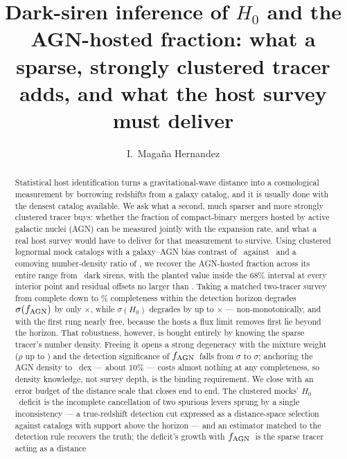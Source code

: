 \documentclass[twocolumn]{aastex631}
\newcommand{\Hz}{\ensuremath{H_0}}
\newcommand{\fagn}{\ensuremath{f_{\rm AGN}}}
\begin{document}
\title{Dark-siren inference of $H_0$ and the AGN-hosted fraction: what a sparse,
strongly clustered tracer adds, and what the host survey must deliver}

\author{I.~Maga\~na Hernandez}

\begin{abstract}
Statistical host identification turns a gravitational-wave distance into a
cosmological measurement by borrowing redshifts from a galaxy catalog, and it is
usually done with the densest catalog available. We ask what a second, much
sparser and more strongly clustered tracer buys: whether the fraction of
compact-binary mergers hosted by active galactic nuclei (AGN) can be measured
jointly with the expansion rate, and what a real host survey would have to
deliver for that measurement to survive. Using clustered lognormal mock
catalogs with a galaxy--AGN bias contrast of \GlassBiasGal\ against
\GlassBiasAgn\ and a comoving number-density ratio of \GlassDensityRatio, we
recover the AGN-hosted fraction across its entire range from \GlassNobs\ dark
sirens, with the planted value inside the 68\% interval at every interior point
and residual offsets no larger than \BaseFOffMaxAbs. Taking a matched
two-tracer survey from complete down to \IncMeighteenCPct\% completeness within
the detection horizon degrades $\sigma(\fagn)$ by only \IncFacFMax$\times$,
while $\sigma(\Hz)$ degrades by up to \IncFacHzeroMax$\times$ ---
non-monotonically, and with the first rung nearly free, because the hosts a
flux limit removes first lie beyond the horizon. That robustness, however, is bought
entirely by knowing the sparse tracer's number density. Freeing it opens a
strong degeneracy with the mixture weight ($\rho$ up to \FreeRhoMax) and the
detection significance of \fagn\ falls from \FreeCompleteExactSig$\sigma$ to
\FreeMeighteenFreeSig$\sigma$; anchoring the AGN density to \FreePriorDexTen\
dex --- about 10\% --- costs almost nothing at any completeness, so density
knowledge, not survey depth, is the binding requirement. We close with
an error budget of the distance scale that closes end to end. The clustered
mocks' \Hz\ deficit is the incomplete cancellation of two spurious levers
sprung by a single inconsistency --- a true-redshift detection cut expressed
as a distance-space selection against catalogs with support above the horizon
--- and an estimator matched to the detection rule recovers the truth; the
deficit's growth with \fagn\ is the sparse tracer acting as a distance

\end{abstract}
\end{document}
